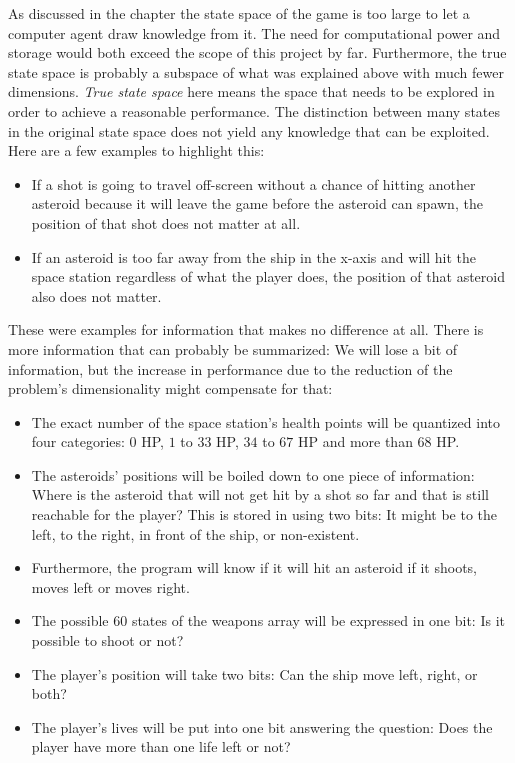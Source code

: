\documentclass[a4paper,10pt]{article}
\begin{document}
As discussed in the chapter  the state space of the game is too large to let a computer agent draw knowledge from it.
The need for computational power and storage would both exceed the scope of this project by far.
Furthermore, the true state space is probably a subspace of what was explained above with much fewer dimensions.
\emph{True state space} here means the space that needs to be explored in order to achieve a reasonable performance. 
The distinction between many states in the original state space does not yield any knowledge that can be exploited.
Here are a few examples to highlight this:
\begin{itemize}
 \item If a shot is going to travel off-screen without a chance of hitting another asteroid because it will leave the game before the asteroid can spawn, the position of that shot does not matter at all.
 \item If an asteroid is too far away from the ship in the x-axis and will hit the space station regardless of what the player does, the position of that asteroid also does not matter.
\end{itemize}
These were examples for information that makes no difference at all.
There is more information that can probably be summarized: We will lose a bit of information, but the increase in performance due to the reduction of the problem's dimensionality might compensate for that:
\begin{itemize}
 \item The exact number of the space station's health points will be quantized into four categories: $0$ HP, $1$ to $33$ HP, $34$ to $67$ HP and more than $68$ HP. %
 \item The asteroids' positions will be boiled down to one piece of information: Where is the asteroid that will not get hit by a shot so far and that is still reachable for the player? 
 This is stored in using two bits: It might be to the left, to the right, in front of the ship, or non-existent. %
 \item Furthermore, the program will know if it will hit an asteroid if it shoots, moves left or moves right. %
 \item The possible $60$ states of the weapons array will be expressed in one bit: Is it possible to shoot or not? %
 \item The player's position will take two bits: Can the ship move left, right, or both? %
 \item The player's lives will be put into one bit answering the question: Does the player have more than one life left or not? %
\end{itemize}
\end{document}
